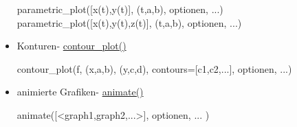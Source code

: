 \documentclass[a4paper,9pt,DIV15,twocolumn]{scrartcl}
\begin{document}
\begin{itemize}
\begin{sagein}
parametric_plot([x(t),y(t)], (t,a,b), optionen, ...)
parametric_plot([x(t),y(t),z(t)], (t,a,b), optionen, ...)
\end{sagein}
\item Konturen- \href{https://sage.math.uni-goettingen.de/doc/static/reference/sage/plot/contour_plot.html#sage.plot.contour_plot.contour_plot}{contour\_plot()}
\begin{sagein}
contour_plot(f, (x,a,b), (y,c,d), contours=[c1,c2,...], optionen, ...)
\end{sagein}
\item animierte Grafiken- \href{https://sage.math.uni-goettingen.de/doc/static/reference/sage/plot/animate.html?highlight=.plot#sage.plot.animate.Animation}{animate()}
\begin{sagein}
animate([<graph1,graph2,...>], optionen, ... ) 
\end{sagein}
\end{itemize}
\end{document}
